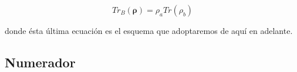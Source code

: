\documentclass[
	12pt, %
]{fphw}
\begin{document}
\begin{equation}
	Tr_B(\bm{\rho}) = \rho_a Tr (\rho_b)
\end{equation}

donde ésta última ecuación es el esquema que adoptaremos de aquí en adelante.

\subsection*{Numerador}










\end{document}
